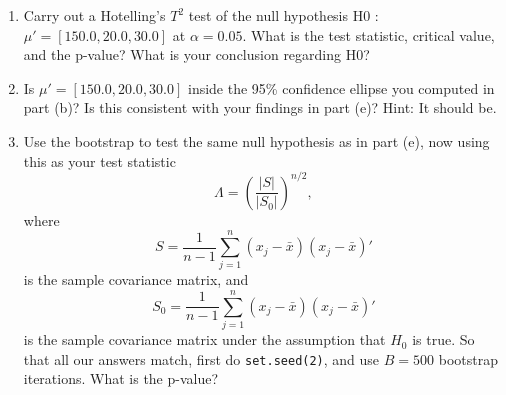 \documentclass[12pt,a4paper]{paper}
\begin{document}
\begin{enumerate}
\begin{enumerate}
\item Carry out a Hotelling's $T^{2}$ test of the null hypothesis H0 : $\mu' = \left[150.0,20.0,30.0\right]$ at $\alpha = 0.05$. What is the test statistic, critical value, and the p-value? What is your conclusion regarding H0?
\item Is $\mu' = [150.0, 20.0, 30.0]$ inside the 95\% confidence ellipse you computed in part (b)? Is this consistent with your findings in part (e)? Hint: It should be.
\item Use the bootstrap to test the same null hypothesis as in part (e), now using this as your test statistic
\[\Lambda = \left(\frac{\left|S\right|}{\left|S_{0}\right|}\right)^{n/2},\]where \[S = \frac{1}{n-1}\sum_{j=1}^{n}(x_{j}-\bar{x})(x_{j}-\bar{x})'\] is the sample covariance matrix, and \[S_{0} = \frac{1}{n-1}\sum_{j=1}^{n}(x_{j}-\bar{x})(x_{j}-\bar{x})'\] is the sample covariance matrix under the assumption that $H_{0}$ is true. So that all our answers match, first do \texttt{set.seed(2)}, and use $B=500$ bootstrap iterations. What is the p-value?
\end{enumerate}
\end{enumerate}
\end{document}
